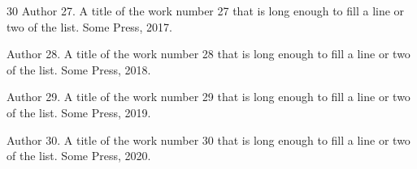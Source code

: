 \documentclass{report}
\begin{document}
\begin{thebibliography}{30}
Author 27.
\newblock A title of the work number 27 that is long enough to fill a line or two of the list.
\newblock Some Press, 2017.

Author 28.
\newblock A title of the work number 28 that is long enough to fill a line or two of the list.
\newblock Some Press, 2018.

Author 29.
\newblock A title of the work number 29 that is long enough to fill a line or two of the list.
\newblock Some Press, 2019.

Author 30.
\newblock A title of the work number 30 that is long enough to fill a line or two of the list.
\newblock Some Press, 2020.
\end{thebibliography}
\end{document}
